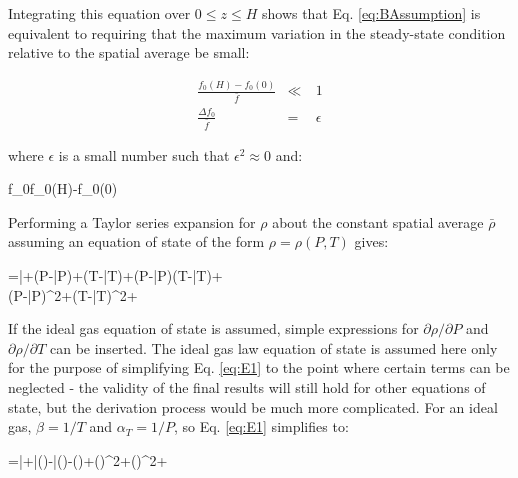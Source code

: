 \documentclass[10pt]{article}
\numberwithin{equation}{section} %
\begin{document}
Integrating this equation over \(0\leq z\leq H\) shows that Eq. \eqref{eq:BAssumption} is equivalent to requiring that the maximum variation in the steady-state condition relative to the spatial average be small:

\begin{subequations}
\label{eq:BA}
\begin{eqnarray}
\frac{f_0(H) - f_0(0)}{\bar{f}}&\ll&\ 1\\
\frac{\Delta f_0}{\bar{f}}&=&\ \epsilon
\end{eqnarray}
\end{subequations}

where \(\epsilon\) is a small number such that \(\epsilon^2\approx0\) and:

\beq
\Delta f_0\equiv f_0(H)-f_0(0)
\eeq

Performing a Taylor series expansion for \(\rho\) about the constant spatial average \(\bar{\rho}\) assuming an equation of state of the form \(\rho=\rho(P,T)\) gives:

\beqa
\label{eq:E1}
\rho=\bar{\rho}+\left(P-\bar{P}\right)+\left(T-\bar{T}\right)+\left(P-\bar{P}\right)\left(T-\bar{T}\right)+\hspace{1cm}\\
\left(P-\bar{P}\right)^2+\left(T-\bar{T}\right)^2+\cdots
\eeqa

If the ideal gas equation of state is assumed, simple expressions for \(\partial\rho/\partial P\) and \(\partial \rho/\partial T\) can be inserted. The ideal gas law equation of state is assumed here only for the purpose of simplifying Eq. \eqref{eq:E1} to the point where certain terms can be neglected - the validity of the final results will still hold for other equations of state, but the derivation process would be much more complicated. For an ideal gas, \(\beta=1/T\) and \(\alpha_T=1/P\), so Eq. \eqref{eq:E1} simplifies to:

\beqa
\label{eq:E2}
\rho=\bar{\rho}+\bar{\rho}\left(\right)-\bar{\rho}\left(\right)-\left(\right)+\left(\right)^2+\left(\right)^2+\cdots
\eeqa
\end{document}
